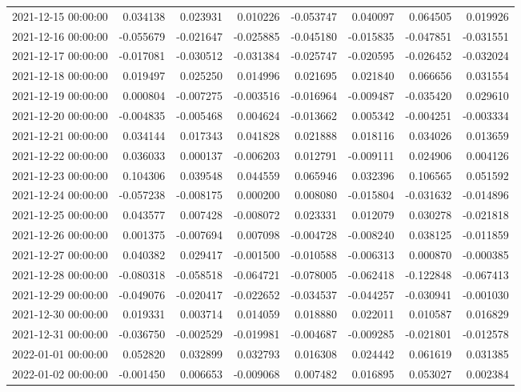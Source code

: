 \begin{tabular}{lrrrrrrr}
2021-12-15 00:00:00 & 0.034138 & 0.023931 & 0.010226 & -0.053747 & 0.040097 & 0.064505 & 0.019926 \\
2021-12-16 00:00:00 & -0.055679 & -0.021647 & -0.025885 & -0.045180 & -0.015835 & -0.047851 & -0.031551 \\
2021-12-17 00:00:00 & -0.017081 & -0.030512 & -0.031384 & -0.025747 & -0.020595 & -0.026452 & -0.032024 \\
2021-12-18 00:00:00 & 0.019497 & 0.025250 & 0.014996 & 0.021695 & 0.021840 & 0.066656 & 0.031554 \\
2021-12-19 00:00:00 & 0.000804 & -0.007275 & -0.003516 & -0.016964 & -0.009487 & -0.035420 & 0.029610 \\
2021-12-20 00:00:00 & -0.004835 & -0.005468 & 0.004624 & -0.013662 & 0.005342 & -0.004251 & -0.003334 \\
2021-12-21 00:00:00 & 0.034144 & 0.017343 & 0.041828 & 0.021888 & 0.018116 & 0.034026 & 0.013659 \\
2021-12-22 00:00:00 & 0.036033 & 0.000137 & -0.006203 & 0.012791 & -0.009111 & 0.024906 & 0.004126 \\
2021-12-23 00:00:00 & 0.104306 & 0.039548 & 0.044559 & 0.065946 & 0.032396 & 0.106565 & 0.051592 \\
2021-12-24 00:00:00 & -0.057238 & -0.008175 & 0.000200 & 0.008080 & -0.015804 & -0.031632 & -0.014896 \\
2021-12-25 00:00:00 & 0.043577 & 0.007428 & -0.008072 & 0.023331 & 0.012079 & 0.030278 & -0.021818 \\
2021-12-26 00:00:00 & 0.001375 & -0.007694 & 0.007098 & -0.004728 & -0.008240 & 0.038125 & -0.011859 \\
2021-12-27 00:00:00 & 0.040382 & 0.029417 & -0.001500 & -0.010588 & -0.006313 & 0.000870 & -0.000385 \\
2021-12-28 00:00:00 & -0.080318 & -0.058518 & -0.064721 & -0.078005 & -0.062418 & -0.122848 & -0.067413 \\
2021-12-29 00:00:00 & -0.049076 & -0.020417 & -0.022652 & -0.034537 & -0.044257 & -0.030941 & -0.001030 \\
2021-12-30 00:00:00 & 0.019331 & 0.003714 & 0.014059 & 0.018880 & 0.022011 & 0.010587 & 0.016829 \\
2021-12-31 00:00:00 & -0.036750 & -0.002529 & -0.019981 & -0.004687 & -0.009285 & -0.021801 & -0.012578 \\
2022-01-01 00:00:00 & 0.052820 & 0.032899 & 0.032793 & 0.016308 & 0.024442 & 0.061619 & 0.031385 \\
2022-01-02 00:00:00 & -0.001450 & 0.006653 & -0.009068 & 0.007482 & 0.016895 & 0.053027 & 0.002384 \\

\end{tabular}

